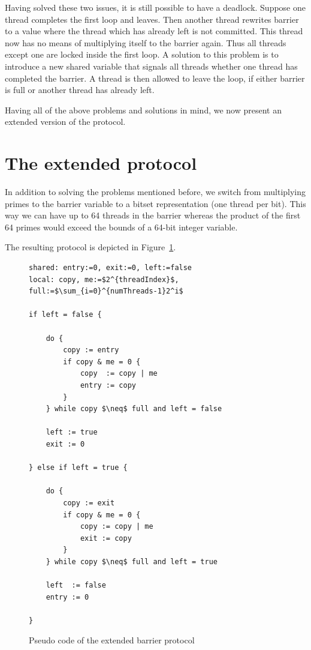 \documentclass[a4paper, 10pt]{article}
\begin{document}
Having solved these two issues, it is still possible to have a deadlock. Suppose one thread completes the first loop and leaves. Then another thread rewrites barrier to a value where the thread which has already left is not committed. This thread now has no means of multiplying itself to the barrier again. Thus all threads except one are locked inside the first loop. A solution to this problem is to introduce a new shared variable that signals all threads whether one thread has completed the barrier. A thread is then allowed to leave the loop, if either barrier is full or another thread has already left.

Having all of the above problems and solutions in mind, we now present an extended version of the protocol.

\section{The extended protocol}
In addition to solving the problems mentioned before, we switch from multiplying primes to the barrier variable to a bitset representation (one thread per bit). This way we can have up to 64 threads in the barrier whereas the product of the first 64 primes would  exceed the bounds of a 64-bit integer variable.

The resulting protocol is depicted in Figure~\ref{fig:barrier-source-code}.

\begin{figure}[htb]
	\centering
	\begin{lstlisting}[mathescape]
shared: entry:=0, exit:=0, left:=false
local: copy, me:=$2^{threadIndex}$, full:=$\sum_{i=0}^{numThreads-1}2^i$

if left = false {

	do {
		copy := entry
		if copy & me = 0 {
			copy  := copy | me
			entry := copy
		}
	} while copy $\neq$ full and left = false

	left := true
	exit := 0

} else if left = true {

	do {
		copy := exit
		if copy & me = 0 {
			copy := copy | me
			exit := copy
		}
	} while copy $\neq$ full and left = true

	left  := false
	entry := 0

}
	\end{lstlisting}
	\caption{Pseudo code of the extended barrier protocol}
	\label{fig:barrier-source-code}
\end{figure}
\end{document}
